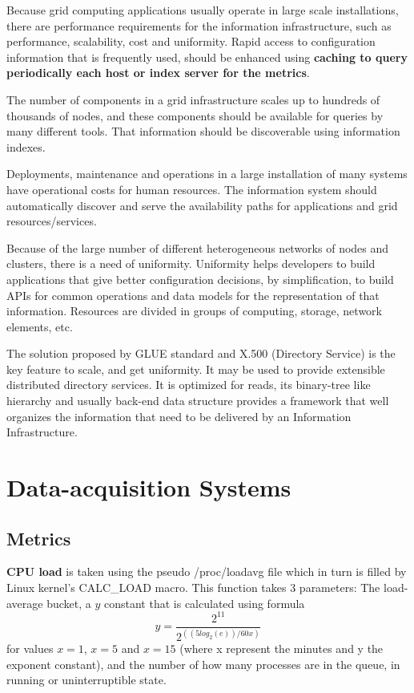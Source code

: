 Because grid computing applications usually operate in large scale installations, there are performance requirements for the information infrastructure, such as performance, scalability, cost and uniformity. Rapid access to configuration information that is frequently used, should be enhanced using {\bf caching to query periodically each host or index server for the metrics}.

The number of components in a grid infrastructure scales up to hundreds of thousands of nodes, and these components should be available for queries by many different tools. That information should be discoverable using information indexes.

Deployments, maintenance and operations in a large installation of many systems have operational costs for human resources. The information system should automatically discover and serve the availability paths for applications and grid resources/services.

Because of the large number of different heterogeneous networks of nodes and clusters, there is a need of uniformity. Uniformity helps developers to build applications that give better configuration decisions, by simplification, to build APIs for common operations and data models for the representation of that information. Resources are divided in groups of computing, storage, network elements, etc.

The solution proposed by GLUE standard and X.500 (Directory Service) is the key feature to scale, and get uniformity. It may be used to provide extensible distributed directory services. It is optimized for reads, its binary-tree like hierarchy and usually back-end data structure provides a framework that well organizes the information that need to be delivered by an Information Infrastructure.\cite{mds1}

\section{Data-acquisition Systems}

\subsection{Metrics}\label{subsec:metrics}

{\bf CPU load} is taken using the pseudo /proc/loadavg file which in turn is
filled by Linux kernel's CALC\_LOAD macro. This function takes 3 parameters:
The load-average bucket, a $y$ constant that is calculated using formula
\[
y=\frac{2^{11}}{2^{((5log_2(e))/60x)}}
\]
for values $x=1$, $x=5$ and $x=15$ (where x represent the minutes and y the
exponent constant), and the number of how many processes are in the queue, in
running or uninterruptible state.

